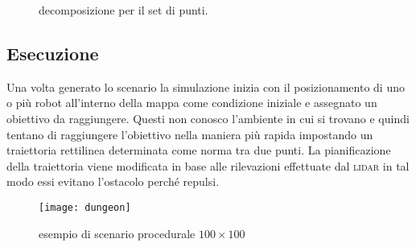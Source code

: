 \begin{figure}[!htb]
  \centering
  \resizebox{0.7\linewidth}{!}{}
  \caption{decomposizione per il set di punti.}
  \label{fig:decomposizione}
\end{figure}

\subsection{Esecuzione}
Una volta generato lo scenario la simulazione inizia con il posizionamento di
uno o più robot all'interno della mappa come condizione iniziale e assegnato un
obiettivo da raggiungere.
Questi non conosco l'ambiente in cui si trovano e quindi tentano di raggiungere
l'obiettivo nella maniera più rapida impostando un traiettoria rettilinea
determinata come norma tra due punti.
La pianificazione della traiettoria viene modificata in base alle rilevazioni
effettuate dal \textsc{lidar} in tal modo essi evitano l'ostacolo perché repulsi.

\begin{figure}[!htb]
  \centering
  \texttt{[image: dungeon]}
  \caption{esempio di scenario procedurale $100\times100$}
  \label{fig:dungeon}
\end{figure}
